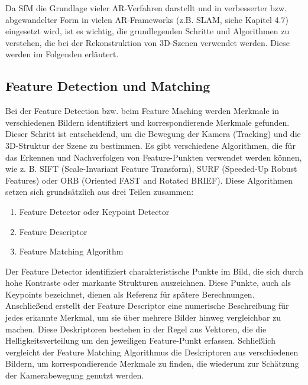 Da SfM die Grundlage vieler AR-Verfahren darstellt und in verbesserter bzw. abgewandelter Form in vielen AR-Frameworks (z.B. SLAM, siehe Kapitel 4.7) eingesetzt wird, ist es wichtig, die grundlegenden Schritte und Algorithmen zu verstehen, die bei der Rekonstruktion von 3D-Szenen verwendet werden. Diese werden im Folgenden erläutert.

\subsection{Feature Detection und Matching}

Bei der Feature Detection bzw. beim Feature Maching werden Merkmale in verschiedenen Bildern identifiziert und korrespondierende Merkmale gefunden. Dieser Schritt ist entscheidend, um die Bewegung der Kamera (Tracking) und die 3D-Struktur der Szene zu bestimmen. Es gibt verschiedene Algorithmen, die für das Erkennen und Nachverfolgen von Feature-Punkten verwendet werden können, wie z. B. SIFT (Scale-Invariant Feature Transform), SURF (Speeded-Up Robust Features) oder ORB (Oriented FAST and Rotated BRIEF). Diese Algorithmen setzen sich grundsätzlich aus drei Teilen zusammen:

\begin{enumerate}
    \item Feature Detector oder Keypoint Detector
    \item Feature Descriptor
    \item Feature Matching Algorithm
\end{enumerate}

Der Feature Detector identifiziert charakteristische Punkte im Bild, die sich durch hohe Kontraste oder markante Strukturen auszeichnen. Diese Punkte, auch als Keypoints bezeichnet, dienen als Referenz für spätere Berechnungen. Anschließend erstellt der Feature Descriptor eine numerische Beschreibung für jedes erkannte Merkmal, um sie über mehrere Bilder hinweg vergleichbar zu machen. Diese Deskriptoren bestehen in der Regel aus Vektoren, die die Helligkeitsverteilung um den jeweiligen Feature-Punkt erfassen. Schließlich vergleicht der Feature Matching Algorithmus die Deskriptoren aus verschiedenen Bildern, um korrespondierende Merkmale zu finden, die wiederum zur Schätzung der Kamerabewegung genutzt werden.

